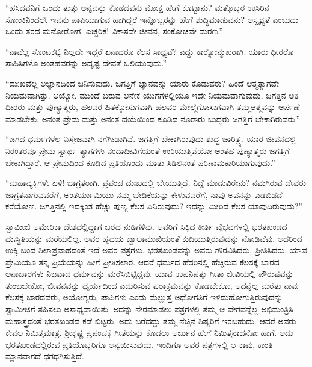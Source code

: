  “ಹಸಿದವನಿಗೆ ಒಂದು ತುತ್ತು ಅನ್ನವನ್ನು ಕೊಡದವನು ಮೋಕ್ಷ ಹೇಗೆ ಕೊಟ್ಟಾನು? ಮತ್ತೊಬ್ಬರ ಉಸಿರಿನ ಸೋಂಕಿನಿಂದಲೇ ಇವನು ಪಾಪಿಯಾಗುವ ಹಾಗಿದ್ದರೆ ಇನ್ನೊಬ್ಬರನ್ನು ಹೇಗೆ ಶುದ್ಧಿಮಾಡುವನು? ಅಸ್ಪೃಶ್ಯತೆ ಎಂಬುದು ಒಂದು ತರದ ಮನೋರೋಗ. ಎಚ್ಚರಿಕೆ! ವಿಕಾಸವೇ ಜೀವನ, ಸಂಕೋಚವೇ ಮರಣ.” 

 “ನಾವೆಲ್ಲ ಸೊಂಟಕಟ್ಟಿ ನಿಲ್ಲದೇ ಇದ್ದರೆ ಏನಾದರೂ ಕೆಲಸ ಸಾಧ್ಯವೆ? ಎದ್ದು ಕಾರ‍್ಯೋನ್ಮುಖ\-ರಾಗಿ. ಯಾರು ಧೀರರೊ ಸಾಹಿಸಿಗಳೊ ಅಂತಹವರನ್ನು ಅದೃಷ್ಟ ದೇವತೆ ಒಲಿಯುವುದು.” 

 “ದುಃಖವೆಲ್ಲ ಅಜ್ಞಾನದಿಂದ ಜನಿಸುವುದು. ಜಗತ್ತಿಗೆ ಜ್ಞಾನವನ್ನು ಯಾರು ಕೊಡುವರು? ಹಿಂದೆ ಆತ್ಮತ್ಯಾಗವೇ ನಿಯಮವಾಗಿತ್ತು. ಅಯ್ಯೋ, ಮುಂದೆ ಬರುವ ಅನೇಕ ಯುಗಗಳಲ್ಲಿಯೂ ಇದೇ ನಿಯಮವಾಗುವುದು. ಜಗತ್ತಿನ ಅತಿ ಧೀರರು ಮತ್ತು ಪುಣ್ಯಾತ್ಮರು, ಹಲವರ ಹಿತಕ್ಕೋಸುಗವಾಗಿ ಹಲವರ ಮೇಲ್ಮೆಗೋಸುಗವಾಗಿ ತಮ್ಮ\break ಆತ್ಮವನ್ನು ಅರ್ಪಣೆ ಮಾಡಬೇಕು. ಅನಂತ ಪ್ರೇಮ ಮತ್ತು ಅನಂತ ದಯೆಯಿಂದ ಕೂಡಿದ ನೂರಾರು ಬುದ್ಧರು ಜಗತ್ತಿಗೆ ಬೇಕಾಗಿರುವರು.” 

 “ಜಗದ ಧರ್ಮಗಳೆಲ್ಲ ನಿಸ್ತೇಜವಾಗಿ ನಗೆಗೀಡಾಗಿವೆ. ಜಗತ್ತಿಗೆ ಬೇಕಾಗಿರುವುದು ಶುದ್ಧ ಚಾರಿತ್ರ್ಯ. ಯಾರ ಜೀವನದಲ್ಲಿ ನಿರಂತರವೂ ಪ್ರೇಮ ಸ್ವಾರ್ಥ ತ್ಯಾಗಗಳು ನಂದಾದೀವಿಗೆಯಂತೆ ಉರಿಯುತ್ತಿವೆಯೋ ಅಂತಹ ಪುಣ್ಯಾತ್ಮರು ಜಗತ್ತಿಗೆ ಬೇಕಾಗಿದ್ದಾರೆ. ಆ ಪ್ರೇಮದಿಂದ ಕೂಡಿದ ಪ್ರತಿಯೊಂದು ಮಾತು ಸಿಡಿಲಿನಂತೆ ಪರಿಣಾಮಕಾರಿಯಾಗುವುದು.” 

 “ಮಹಾವ್ಯಕ್ತಿಗಳೇ ಏಳಿ! ಜಾಗ್ರತರಾಗಿ. ಪ್ರಪಂಚ ದುಃಖದಲ್ಲಿ ಬೇಯುತ್ತಿದೆ. ನಿದ್ದೆ ಮಾಡುವಿರೇನು? ನಮಗಿರುವ ದೇವರು ಜಾಗ್ರತನಾಗುವವರೆಗೆ, ಅಂತರ್ಯಾಮಿಯು ನಮ್ಮ ಬೇಡಿಕೆಯನ್ನು ಕೇಳುವವರೆಗೆ, ನಾವು ಅವನನ್ನು ಎಡಬಿಡದೆ ಕರೆಯೋಣ. ಜಗತ್ತಿನಲ್ಲಿ ಇದಕ್ಕಿಂತ ಹೆಚ್ಚು ಪುಣ್ಯ ಕೆಲಸ ಏನಿರುವುದು? ಇದನ್ನು ಮೀರಿದ ಕೆಲಸ ಯಾವುದಿರುವುದು?” 

 ಸ್ವಾಮೀಜಿ ಅಮೇರಿಕಾ ದೇಶದಲ್ಲಿದ್ದಾಗ ಬರೆದ ನುಡಿಗಳಿವು. ಅವರಿಗೆ ಸಿಕ್ಕಿದ ಕೀರ್ತಿ ವೈಭವಗಳಲ್ಲಿ ಭರತಖಂಡದ ದುಃಸ್ಥಿತಿಯನ್ನು ಮರೆಯಲಿಲ್ಲ. ಅವರ ಹೃದಯ ಜ್ವಾಲಾಮುಖಿಯಂತೆ ಕುದಿಯುತ್ತಿರುವುದನ್ನು ನೋಡಿವೆವು. ಅದರಿಂದ ಉಕ್ಕಿ ಬಂದ ಶಿಲಾಪ್ರವಾಹದಂತೆ ಇದೆ ಅವರ ಪತ್ರಗಳು. ಭರತಖಂಡವನ್ನು ಅವರು ಗೌರವಿಸಿದರು, ಪ್ರೀತಿಸಿದರು. ಯಾವ ಪ್ರೇಮಿಯೂ ತನ್ನ ಪ್ರಿಯೆಯನ್ನು ಹೀಗೆ ಪ್ರೀತಿಸಲಾರ. ಆದರೆ ಧರ್ಮದ ಹೆಸರಿನಲ್ಲಿ ಹೆಚ್ಚಿರುವ ಕೆಲಸಕ್ಕೆ ಬಾರದ ಅನಾಚಾರಗಳು ನಿಜವಾದ ಧರ್ಮವನ್ನು ಮರೆಸಿಬಿಟ್ಟಿದ್ದವು. ಯಾವ ಉಪನಿಷತ್ತು ಗೀತಾ ಜೀವಿಯಲ್ಲಿ ಪೌರುಷವನ್ನು ತುಂಬಬೇಕೋ, ಜೀವನವನ್ನು ಧೈರ್ಯದಿಂದ ಎದುರಿಸುವ ಪರಾಕ್ರಮವನ್ನು ಕೊಡಬೇಕೋ, ಅದನ್ನೆಲ್ಲ ಮರೆತು ನಾವು ಕೆಲಸಕ್ಕೆ ಬಾರದವರು, ಅಯೋಗ್ಯರು, ಪಾಪಿಗಳು ಎಂದು ಮೆಲ್ಲುತ್ತ ಅಧೋಗತಿಗೆ ಇಳಿದುಹೋಗುತ್ತಿರುವುದನ್ನು ಸ್ವಾಮೀಜಿಗೆ ಸಹಿಸಲು ಅಸಾಧ್ಯವಾಯಿತು. ಅದನ್ನು ನೇರಮಾಡಲು ಪತ್ರಗಳಲ್ಲಿ ತಮ್ಮ ಆ ವೇಗವನ್ನೆಲ್ಲ ಅಭಿಮಂತ್ರಿಸಿ ಮಹಾಸ್ತ್ರದಂತೆ ಭರತಖಂಡದ ಕಡೆ ಬಿಟ್ಟರು. ಅದು ಬರೆದದ್ದು ತಮ್ಮ ನೆಚ್ಚಿನ ಶಿಷ್ಯರಿಗೆ ಇರಬಹುದು. ಆದರೆ ಅವರು ಕೇವಲ ನಿಮಿತ್ತಮಾತ್ರ. ಶ‍್ರೀಕೃಷ್ಣ ಪ್ರಪಂಚಕ್ಕೆ ಗೀತೆಯನ್ನು ಕೊಡಲು ಅರ್ಜುನ ಹೇಗೆ ನಿಮಿತ್ತನಾದನೋ ಹಾಗೆ. ಅದು ಭರತಖಂಡದಲ್ಲಿರುವ ಪ್ರತಿಯೊಬ್ಬರಿಗೂ ಅನ್ವಯಿಸುವುದು. ಇಂದಿಗೂ ಅವರ ಪತ್ರಗಳಲ್ಲಿ ಆ ಕಾವು, ಕಾಂತಿ ಮ್ಲಾನವಾಗದೆ ಧಗಧಗಿಸುತ್ತಿದೆ. 

